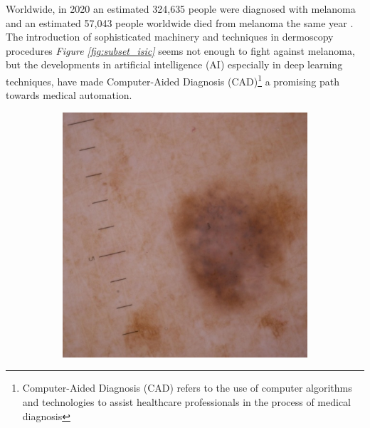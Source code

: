 Worldwide, in 2020 an estimated 324,635 people were diagnosed with melanoma and
an estimated 57,043 people worldwide died from melanoma the same year
\cite{CancerStats}. The introduction of sophisticated machinery and techniques
in dermoscopy procedures \textit{Figure \ref{fig:subset_isic}} seems not enough
to fight against melanoma, but the developments in artificial intelligence (AI)
especially in deep learning techniques, have made Computer-Aided Diagnosis
(CAD)\footnote{Computer-Aided Diagnosis (CAD) refers to the use of computer
algorithms and technologies to assist healthcare professionals in the process
of medical diagnosis} a promising path towards medical automation.

\begin{figure}[h!] \centering
  \begin{subfigure}{0.3\textwidth}
    \includegraphics[width=\textwidth]{imatges/introduction/subset_isic/ISIC_1752943.jpg}
  \end{subfigure}
  \hfill
  \begin{subfigure}{0.3\textwidth}

\end{subfigure}
\end{figure}
